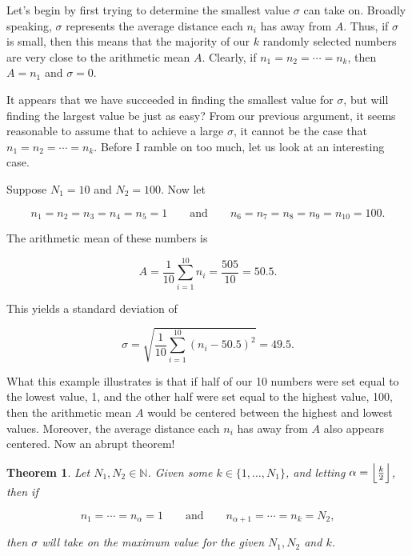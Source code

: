 \documentclass{article}
\makeatletter
\DeclarePairedDelimiter{\floor}{\lfloor}{\rfloor}
\newtheorem{theorem}{Theorem}[section]
\theoremstyle{definition}
\theoremstyle{remark}
\let\oldproofname=\proofname
\renewcommand{\proofname}{\bf{\textit{\oldproofname}}}
\theoremstyle{definition}
\renewenvironment{proof}[1][\proofname]{\par
  \pushQED{\qed}%
  \normalfont \topsep6\p@\@plus6\p@\relax
  \list{}{\leftmargin=0mm
          \rightmargin=0mm
          \settowidth{\itemindent}{\itshape#1}%
          \labelwidth=\itemindent
          \parsep=0pt \listparindent=0mm%
  }
  \item[\hskip\labelsep
        \itshape
    #1\@addpunct{.}]\ignorespaces
}{%
  \popQED\endlist\@endpefalse
}
\makeatother
\begin{document}
Let's begin by first trying to determine the smallest value $\sigma$ can take on. Broadly speaking, $\sigma$ represents the average distance each $n_i$ has away from $A$. Thus, if $\sigma$ is small, then this means that the majority of our $k$ randomly selected numbers are very close to the arithmetic mean $A$. Clearly, if $n_1=n_2=\cdots=n_k$, then $A=n_1$ and $\sigma=0$.\par It appears that we have succeeded in finding the smallest value for $\sigma$, but will finding the largest value be just as easy? From our previous argument, it seems reasonable to assume that to achieve a large $\sigma$, it cannot be the case that $n_1=n_2=\cdots=n_k$. Before I ramble on too much, let us look at an interesting case.\par Suppose $N_1=10$ and $N_2=100$. Now let 

\begin{equation*}
    n_1=n_2=n_3=n_4=n_5=1 \quad\quad\text{and}\quad\quad n_6=n_7=n_8=n_9=n_{10}=100.
\end{equation*}

\noindent The arithmetic mean of these numbers is 

\begin{equation*}
    A=\frac{1}{10}\sum_{i=1}^{10}n_i=\frac{505}{10}=50.5.
\end{equation*}

\noindent This yields a standard deviation of 

\begin{equation*}
    \sigma=\sqrt{\frac{1}{10}\sum_{i=1}^{10}(n_i-50.5)^2}=49.5.
\end{equation*}

What this example illustrates is that if half of our 10 numbers were set equal to the lowest value, 1, and the other half were set equal to the highest value, 100, then the arithmetic mean $A$ would be centered between the highest and lowest values. Moreover, the average distance each $n_i$ has away from $A$ also appears centered. Now an abrupt theorem!

\begin{theorem}
    Let $N_1,N_2\in\mathbb{N}$. Given some $k\in\{1,\dots,N_1\}$, and letting $\alpha=\floor*{\frac{k}{2}}$, then if 
    
    \begin{equation*}
        n_1=\cdots=n_{\alpha}=1\quad\quad\text{and}\quad\quad n_{\alpha+1}=\cdots=n_k=N_2,
    \end{equation*}
    
    \noindent then $\sigma$ will take on the maximum value for the given $N_1,N_2$ and $k$.
\end{theorem}

\begin{proof}

\end{proof}
\end{document}
